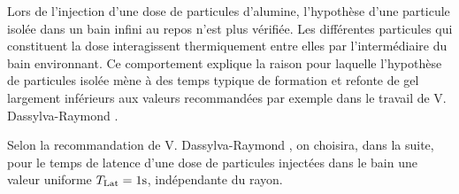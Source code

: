 Lors de l'injection d'une dose de particules d'alumine, l'hypothèse
d'une particule isolée dans un bain infini au repos n'est plus
vérifiée. Les différentes particules qui constituent la dose
interagissent thermiquement entre elles par l'intermédiaire du bain
environnant. Ce comportement explique la raison pour laquelle
l'hypothèse de particules isolée mène à des temps typique de
formation et refonte de gel largement inférieurs aux valeurs
recommandées par exemple dans le travail de V. Dassylva-Raymond \cite{Dassylva2015}.

Selon la recommandation de V. Dassylva-Raymond \cite{Dassylva2015}, on
choisira, dans la suite, pour le temps de latence d'une dose de
particules injectées dans le bain une valeur uniforme $T_\text{Lat} =
1\si{\second}$, indépendante du rayon.
